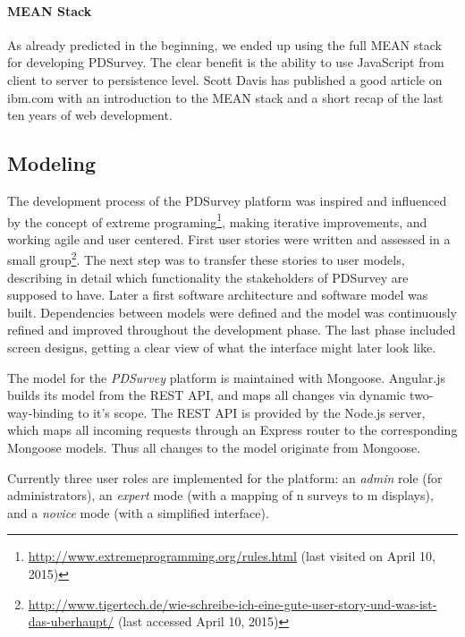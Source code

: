 		\paragraph{MEAN Stack}
		As already predicted in the beginning, we ended up using the full MEAN stack for developing PDSurvey. The clear benefit is the ability to use JavaScript from client to server to persistence level. Scott Davis has published a good article on ibm.com with an introduction to the MEAN stack and a short recap of the last ten years of web development\cite{Scott2014MEANStack}.






\clearpage

\subsection{Modeling}
\label{sec:implementation:modeling}

	The development process of the PDSurvey platform was inspired and influenced by the concept of extreme programing\footnote{\url{http://www.extremeprogramming.org/rules.html} (last visited on April 10, 2015)}, making iterative improvements, and working agile and user centered. First user stories were written and assessed in a small group\footnote{\url{http://www.tigertech.de/wie-schreibe-ich-eine-gute-user-story-und-was-ist-das-uberhaupt/} (last accessed April 10, 2015)}. The next step was to transfer these stories to user models, describing in detail which functionality the stakeholders of PDSurvey are supposed to have. Later a first software architecture and software model was built. Dependencies between models were defined and the model was continuously refined and improved throughout the development phase. The last phase included screen designs, getting a clear view of what the interface might later look like.

	The model for the \textit{PDSurvey} platform is maintained with Mongoose. Angular.js builds its model from the REST API, and maps all changes via dynamic two-way-binding to it's scope. The REST API is provided by the Node.js server, which maps all incoming requests through an Express router to the corresponding Mongoose models. Thus all changes to the model originate from Mongoose.

	Currently three user roles are implemented for the platform: an \textit{admin} role (for administrators), an \textit{expert} mode (with a mapping of n surveys to m displays), and a \textit{novice} mode (with a simplified interface).

